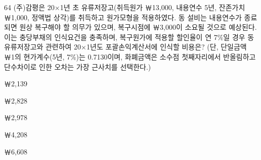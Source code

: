 \begin{question}{64}
(주)감평은 20×1년 초 유류저장고(취득원가 ￦13,000, 내용연수 5년, 잔존가치 ￦1,000, 정액법 상각)를 취득하고 원가모형을 적용하였다. 동 설비는 내용연수가 종료되면 원상 복구해야 할 의무가 있으며, 복구시점에 ￦3,000이 소요될 것으로 예상된다. 이는 충당부채의 인식요건을 충족하며, 복구원가에 적용할 할인율이 연 7\%일 경우 동 유류저장고와 관련하여 20×1년도 포괄손익계산서에 인식할 비용은? (단, 단일금액 ￦1의 현가계수(5년, 7\%)는 0.7130이며, 화폐금액은 소수점 첫째자리에서 반올림하고 단수차이로 인한 오차는 가장 근사치를 선택한다.)
\begin{choices}
  \item ￦2,139
  \item ￦2,828
  \item ￦2,978
  \item ￦4,208
  \item ￦6,608
\end{choices}
\end{question}
